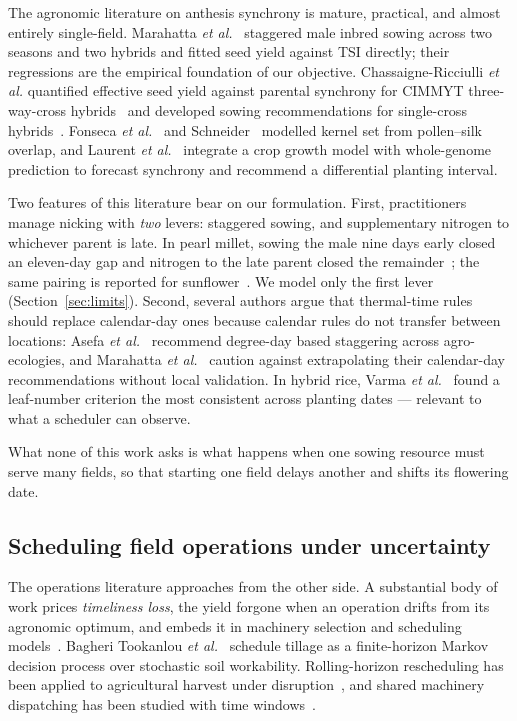 \documentclass[10pt,twocolumn]{article}
\begin{document}
The agronomic literature on anthesis synchrony is mature, practical, and
almost entirely single-field. Marahatta \textit{et al.}~\cite{marahatta2025}
staggered male inbred sowing across two seasons and two hybrids and fitted
seed yield against TSI directly; their regressions are the empirical
foundation of our objective. Chassaigne-Ricciulli \textit{et al.} quantified
effective seed yield against parental synchrony for CIMMYT three-way-cross
hybrids~\cite{chassaigne2021} and developed sowing recommendations for
single-cross hybrids~\cite{chassaigne2020}. Fonseca \textit{et
al.}~\cite{fonseca2004} and Schneider~\cite{schneider2005} modelled kernel
set from pollen--silk overlap, and Laurent \textit{et al.}~\cite{laurent2025}
integrate a crop growth model with whole-genome prediction to forecast
synchrony and recommend a differential planting interval.

Two features of this literature bear on our formulation. First,
practitioners manage nicking with \emph{two} levers: staggered sowing, and
supplementary nitrogen to whichever parent is late. In pearl millet, sowing
the male nine days early closed an eleven-day gap and nitrogen to the late
parent closed the remainder~\cite{priyanka2017}; the same pairing is reported
for sunflower~\cite{patil2026}. We model only the first lever
(Section~\ref{sec:limits}). Second, several authors argue that thermal-time
rules should replace calendar-day ones because calendar rules do not
transfer between locations: Asefa \textit{et al.}~\cite{asefa2024} recommend
degree-day based staggering across agro-ecologies, and Marahatta \textit{et
al.}~\cite{marahatta2025} caution against extrapolating their calendar-day
recommendations without local validation. In hybrid rice, Varma \textit{et
al.}~\cite{varma2018} found a leaf-number criterion the most consistent
across planting dates --- relevant to what a scheduler can observe.

What none of this work asks is what happens when one sowing resource must
serve many fields, so that starting one field delays another and shifts its
flowering date.

\subsection{Scheduling field operations under uncertainty}

The operations literature approaches from the other side. A substantial
body of work prices \emph{timeliness loss}, the yield forgone when an
operation drifts from its agronomic optimum, and embeds it in machinery
selection and scheduling models~\cite{sun2023}. Bagheri Tookanlou
\textit{et al.}~\cite{bagheri2025} schedule tillage as a finite-horizon
Markov decision process over stochastic soil workability. Rolling-horizon
rescheduling has been applied to agricultural harvest under
disruption~\cite{rollinghorizon2023}, and shared machinery dispatching has
been studied with time windows~\cite{shared2022}.
\end{document}
